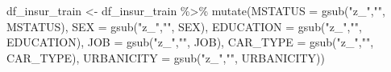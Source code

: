 \documentclass[
]{article}
\newenvironment{Shaded}{\begin{snugshade}}{\end{snugshade}}
\newcommand{\AttributeTok}[1]{\textcolor[rgb]{0.77,0.63,0.00}{#1}}
\newcommand{\FunctionTok}[1]{\textcolor[rgb]{0.00,0.00,0.00}{#1}}
\newcommand{\NormalTok}[1]{#1}
\newcommand{\OtherTok}[1]{\textcolor[rgb]{0.56,0.35,0.01}{#1}}
\newcommand{\SpecialCharTok}[1]{\textcolor[rgb]{0.00,0.00,0.00}{#1}}
\newcommand{\StringTok}[1]{\textcolor[rgb]{0.31,0.60,0.02}{#1}}
\begin{document}
\begin{Shaded}
\begin{Highlighting}[]
\NormalTok{df\_insur\_train }\OtherTok{\textless{}{-}}\NormalTok{ df\_insur\_train }\SpecialCharTok{\%\textgreater{}\%} 
  \FunctionTok{mutate}\NormalTok{(}\AttributeTok{MSTATUS =} \FunctionTok{gsub}\NormalTok{(}\StringTok{"z\_"}\NormalTok{,}\StringTok{""}\NormalTok{, MSTATUS), }\AttributeTok{SEX =} \FunctionTok{gsub}\NormalTok{(}\StringTok{"z\_"}\NormalTok{,}\StringTok{""}\NormalTok{, SEX),}
         \AttributeTok{EDUCATION =} \FunctionTok{gsub}\NormalTok{(}\StringTok{"z\_"}\NormalTok{,}\StringTok{""}\NormalTok{, EDUCATION), }\AttributeTok{JOB =} \FunctionTok{gsub}\NormalTok{(}\StringTok{"z\_"}\NormalTok{,}\StringTok{""}\NormalTok{, JOB),}
         \AttributeTok{CAR\_TYPE =} \FunctionTok{gsub}\NormalTok{(}\StringTok{"z\_"}\NormalTok{,}\StringTok{""}\NormalTok{, CAR\_TYPE), }\AttributeTok{URBANICITY =} \FunctionTok{gsub}\NormalTok{(}\StringTok{"z\_"}\NormalTok{,}\StringTok{""}\NormalTok{,}
\NormalTok{                                                               URBANICITY))}
\end{Highlighting}
\end{Shaded}
\end{document}
